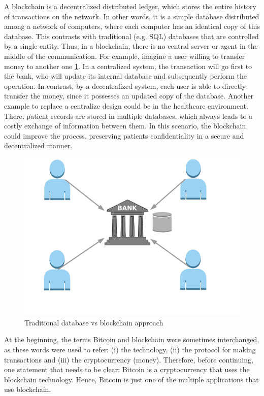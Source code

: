 A blockchain is a decentralized distributed ledger, which stores the entire history of transactions on the network. In other words, it is a simple database distributed among a network of computers, where each computer has an identical copy of this database. This contrasts with traditional (e.g. SQL) databases that are controlled by a single entity. Thus, in a blockchain, there is no central server or agent in the middle of the communication. For example, imagine a user willing to transfer money to another one \ref{fig:CentralizedvsDecentralized}. In a centralized system, the transaction will go first to the bank, who will update its internal database and subsequently perform the operation. In contrast, by a decentralized system, each user is able to directly transfer the money, since it possesses an updated copy of the database. Another example to replace a centralize design could be in the healthcare environment. There, patient records are stored in multiple databases, which always leads to a costly exchange of information between them. In this scenario, the blockchain could improve the process, preserving patients confidentiality in a secure and decentralized manner.

\begin{figure}[bth]
	\centering
	\includegraphics[width=0.8\linewidth]{gfx/cenVsDec}    
  	\caption{Traditional database vs blockchain approach}
  	\label{fig:CentralizedvsDecentralized}
\end{figure}

At the beginning, the terms Bitcoin and blockchain were sometimes interchanged, as these words were used to refer: (i) the technology, (ii) the protocol for making transactions and (iii) the cryptocurrency (money). Therefore, before continuing, one statement that needs to be clear: Bitcoin is a cryptocurrency that uses the blockchain technology. Hence, Bitcoin is just one of the multiple applications that use blockchain. 

